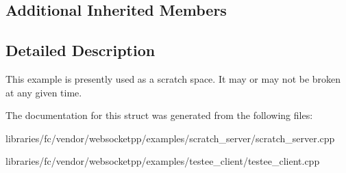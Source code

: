 \subsection*{Additional Inherited Members}


\subsection{Detailed Description}
This example is presently used as a scratch space. It may or may not be broken at any given time. 

The documentation for this struct was generated from the following files\+:\begin{DoxyCompactItemize}
\item 
libraries/fc/vendor/websocketpp/examples/scratch\+\_\+server/scratch\+\_\+server.\+cpp\item 
libraries/fc/vendor/websocketpp/examples/testee\+\_\+client/testee\+\_\+client.\+cpp\end{DoxyCompactItemize}
